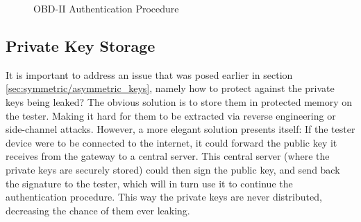 \documentclass[master=cws,masteroption=vs,english]{kulemt}
\begin{document}
\begin{figure}[h]
	\centering
	\caption{OBD-II Authentication Procedure}
	\label{fig:authentication_procedure}
\end{figure}

\subsection{Private Key Storage} It is important to address an issue that was posed earlier in section \ref{sec:symmetric/asymmetric_keys}, namely how to protect against the private keys being leaked? The obvious solution is to store them in protected memory on the tester. Making it hard for them to be extracted via reverse engineering or side-channel attacks. However, a more elegant solution presents itself: If the tester device were to be connected to the internet, it could forward the public key it receives from the gateway to a central server. This central server (where the private keys are securely stored) could then sign the public key, and send back the signature to the tester, which will in turn use it to continue the authentication procedure. This way the private keys are never distributed, decreasing the chance of them ever leaking. 
\end{document}
